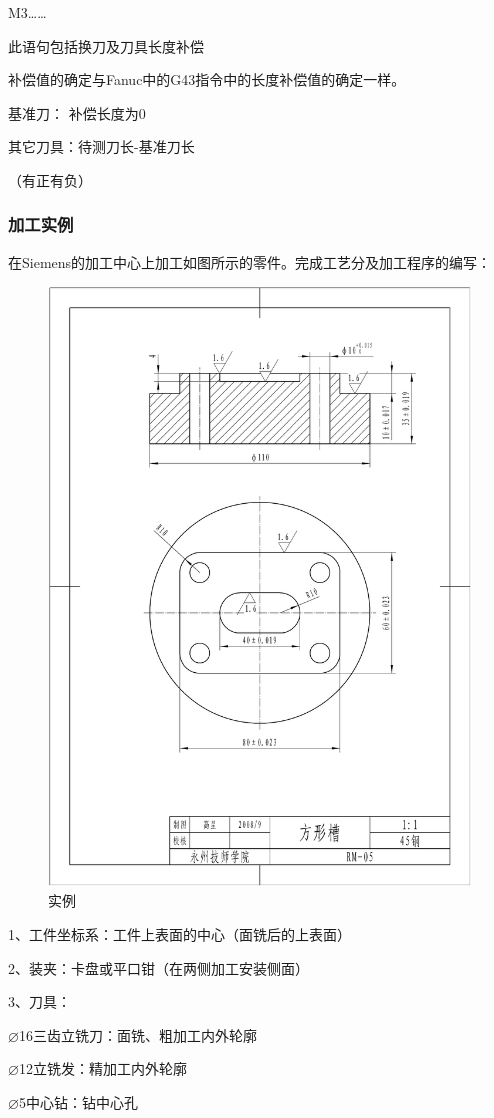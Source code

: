 M3……

此语句包括换刀及刀具长度补偿

补偿值的确定与Fanuc中的G43指令中的长度补偿值的确定一样。

基准刀： 补偿长度为0

其它刀具：待测刀长-基准刀长

（有正有负）

\subsubsection{加工实例}

在Siemens的加工中心上加工如图所示的零件。完成工艺分及加工程序的编写：


\begin{figure}[h]
	\centering
	\includegraphics[width=0.7\linewidth]{data/image/26-1}
	\caption{实例}
	\label{fig:26-1}
\end{figure}


1、工件坐标系：工件上表面的中心（面铣后的上表面）

2、装夹：卡盘或平口钳（在两侧加工安装侧面）

3、刀具：

$\varnothing$16三齿立铣刀：面铣、粗加工内外轮廓

$\varnothing$12立铣发：精加工内外轮廓

$\varnothing$5中心钻：钻中心孔

